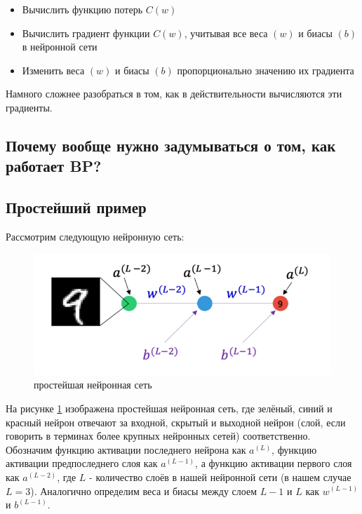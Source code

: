 \documentclass[a4paper, 10pt, openany]{book} %
\begin{document}
	\begin{itemize}
		\item Вычислить функцию потерь $C(w)$
		\item Вычислить градиент функции $C(w)$, учитывая все веса $(w)$ и биасы $(b)$ в нейронной сети
		\item Изменить веса $(w)$ и биасы $(b)$ пропорционально значению их градиента
	\end{itemize}
	
	Намного сложнее разобраться в том, как в действительности вычисляются эти градиенты.
	
	\subsection{Почему вообще нужно задумываться о том, как работает BP?}
	
	\subsection{Простейший пример}
	
	Рассмотрим следующую нейронную сеть:
	
	\begin{figure}[h!]
		\centering
		\includegraphics[width=\linewidth]{pictures/backpropagation/1-1-1_network.png}
		\caption{простейшая нейронная сеть}
		\label{simplest_nn}
	\end{figure}
	
	На рисунке \ref{simplest_nn} изображена простейшая нейронная сеть, где зелёный, синий и красный нейрон отвечают за входной, скрытый и выходной нейрон (слой, если говорить в терминах более крупных нейронных сетей) соответственно. Обозначим функцию активации последнего нейрона как $a^{(L)}$, функцию активации предпоследнего слоя как $a^{(L-1)}$, а функцию активации первого слоя как $a^{(L-2)}$, где $L$ - количество слоёв в нашей нейронной сети (в нашем случае $L=3$). Аналогично определим веса и биасы между слоем $L-1$ и $L$ как $w^{(L-1)}$ и $b^{(L-1)}$.
	
\end{document}
